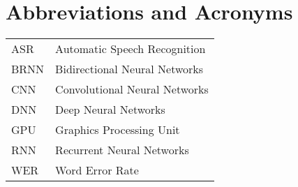 \chapter*{Abbreviations and Acronyms}


\noindent
\begin{longtable}{@{}p{}p{}@{}}
ASR & Automatic Speech Recognition \\
BRNN & Bidirectional Neural Networks\\
CNN & Convolutional Neural Networks\\
DNN & Deep Neural Networks \\ 
GPU & Graphics Processing Unit \\
RNN & Recurrent Neural Networks \\
WER & Word Error Rate \\
\end{longtable}
